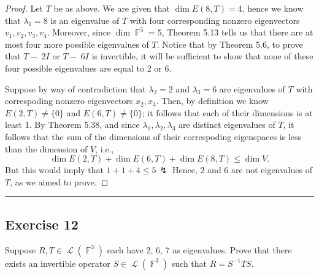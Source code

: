 \documentclass[letterpaper, 12pt]{amsart}
\DeclareMathOperator{\F}{\mathbb{F}}				%
\DeclareMathOperator{\Ell}{\mathscr{L}}				%
\theoremstyle{definition}  							%
\begin{document}
		\begin{proof}
		Let $T$ be as above.
		We are given that $\dim{E(8, T)} = 4$, hence we know that $\lambda_{1} = 8$ is an eigenvalue of $T$ with four corresponding nonzero eigenvectors $v_{1}, v_{2}, v_{3}, v_{4}$.
		Moreover, since $\dim \F^{5} = 5$, Theorem 5.13 tells us that there are at most four more possible eigenvalues of $T$.
		Notice that by Theorem 5.6, to prove that $T-􏰋2I$ or $T-􏰋6I$ is invertible, it will be sufficient to show that none of these four possible eigenvalues are equal to 2 or 6.

		Suppose by way of contradiction that $\lambda_{2} = 2$ and $\lambda_{3} = 6$ are eigenvalues of $T$ with correspoding nonzero eigenvectors $x_{2}, x_{3}$.
		Then, by definition we know $E(2,T) \neq \{ 0 \}$ and $E(6,T) \neq \{ 0 \}$; it follows that each of their dimensions is at least 1.
		By Theorem 5.38, and since $\lambda_{1}, \lambda_{2}, \lambda_{3}$ are distinct eigenvalues of $T$, it follows that the sum of the dimensions of their correspoding eigenspaces is less than the dimension of $V$, i.e., $$\dim{E(2,T)} + \dim{E(6,T)} + \dim{E(8,T)} \leq \dim{V}.$$
		But this would imply that $1 + 1 + 4 \leq 5 \, \lightning$
		Hence, $2$ and $6$ are not eigenvalues of $T$, as we aimed to prove. 
		\end{proof}
		\vspace*{2mm}
		\hrule
		\vspace*{2mm}

		\subsection*{Exercise 12}
		Suppose $R,T \in \Ell(\F^{3})$ each have 2, 6, 7 as eigenvalues. 
		Prove that there exists an invertible operator $S \in \Ell(\F^{3})$ such that $R = S^{-1}TS$.
		\vspace*{3mm}
\end{document}
